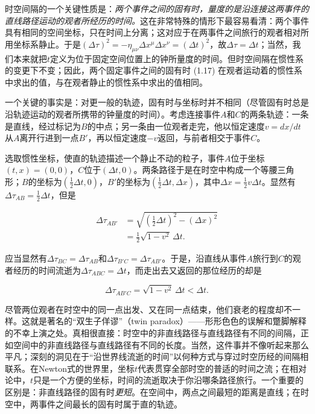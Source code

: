 时空间隔的一个关键性质是：\emph{两个事件之间的固有时，量度的是沿连接这两事件的直线路径运动的观者所经历的时间。}这在非常特殊的情形下最容易看清：两个事件具有相同的空间坐标，只在时间上分离；这对应于在两事件之间旅行的观者相对所用坐标系静止。于是$(\Delta\tau)^2=-\eta_{\mu\nu}\Delta x^\mu\Delta x^\nu=(\Delta t)^2$，故$\Delta\tau=\Delta t$；当然，我们本来就把$t$定义为位于固定空间位置上的钟所量度的时间。但时空间隔在惯性系的变更下不变；因此，两个固定事件之间的固有时 (1.17) 在观者运动着的惯性系中求出的值，与在观者静止的惯性系中求出的值相同。

一个关键的事实是：对更一般的轨迹，固有时与坐标时并不相同（尽管固有时总是沿轨迹运动的观者所携带的钟量度的时间）。考虑连接事件$A$和$C$的两条轨迹：一条是直线，经过标记为$B$的中点；另一条由一位观者走完，他以恒定速度$v=dx/dt$从$A$离开行进到一点$B'$，再以恒定速度$-v$返回，与前者相交于事件$C$。


选取惯性坐标，使直的轨迹描述一个静止不动的粒子，事件$A$位于坐标$(t,x)=(0,0)$，$C$位于$(\Delta t,0)$。两条路径于是在时空中构成一个等腰三角形；$B$的坐标为$(\frac{1}{2}\Delta t,0)$，$B'$的坐标为$(\frac{1}{2}\Delta t,\Delta x)$，其中$\Delta x=\frac{1}{2}v\Delta t$。显然有$\Delta\tau_{AB}=\frac{1}{2}\Delta t$，但是

\begin{equation*}
\begin{aligned}
\Delta\tau_{AB'} &= \sqrt{\left(\tfrac{1}{2}\Delta t\right)^2 - (\Delta x)^2} \\
&= \tfrac{1}{2}\sqrt{1-v^2}\,\Delta t.
\end{aligned}
\tag{1.18}
\end{equation*}

应当显然有$\Delta\tau_{BC}=\Delta\tau_{AB}$和$\Delta\tau_{B'C}=\Delta\tau_{AB'}$。于是，沿直线从事件$A$旅行到$C$的观者经历的时间流逝为$\Delta\tau_{ABC}=\Delta t$，而走出去又返回的那位经历的却是

\begin{equation*}
\Delta\tau_{AB'C} = \sqrt{1-v^2}\,\Delta t < \Delta t.
\tag{1.19}
\end{equation*}

尽管两位观者在时空中的同一点出发、又在同一点结束，他们衰老的程度却不一样。这就是著名的“双生子佯谬”（twin paradox）——形形色色的误解和蹩脚解释的不幸上演之处。真相很直接：时空中的非直线路径与直线路径有不同的间隔，正如空间中的非直线路径与直线路径有不同的长度。当然，这件事并不像听起来那么平凡；深刻的洞见在于“沿世界线流逝的时间”以何种方式与穿过时空历经的间隔相联系。在Newton式的世界里，坐标$t$代表贯穿全部时空的普适的时间之流；在相对论中，$t$只是一个方便的坐标，时间的流逝取决于你沿哪条路径旅行。一个重要的区别是：非直线路径的固有时\emph{更短}。在空间中，两点之间最短的距离是直线；在时空中，两事件之间最长的固有时属于直的轨迹。

